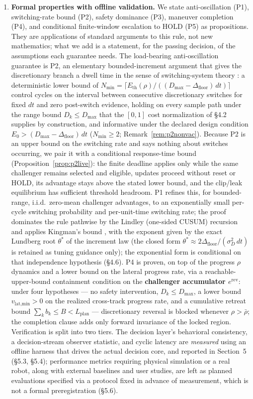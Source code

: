 \documentclass[11pt]{article}
\newcommand{\Dfloor}{\Delta_{\text{floor}}}
\newcommand{\Erev}{e^{\text{rev}}}
\newcommand{\Eth}{E_{\text{th}}}
\begin{document}
\begin{enumerate}
\item \textbf{Formal properties with offline validation.} We state anti-oscillation (P1), switching-rate bound (P2), safety dominance (P3), maneuver completion (P4), and conditional finite-window escalation to HOLD (P5) as propositions. They are applications of standard arguments to this rule, not new mathematics; what we add is a statement, for the passing decision, of the assumptions each guarantee needs. The load-bearing anti-oscillation guarantee is P2, an elementary bounded-increment argument that gives the discretionary branch a dwell time in the sense of switching-system theory \cite{hespanha1999dwell}: a deterministic lower bound of $N_{\min} = \lceil \Eth(\rho)/((D_{\max}-\Dfloor)\,dt)\rceil$ control cycles on the interval between consecutive discretionary switches for fixed $dt$ and zero post-switch evidence, holding on every sample path under the range bound $D_k \le D_{\max}$ that the $[0,1]$ cost normalization of \S4.2 supplies by construction, and informative under the declared design condition $E_0 > (D_{\max}-\Dfloor)\,dt$ ($N_{\min} \ge 2$; Remark~\ref{rem:p2nonvac}). Because P2 is an upper bound on the switching rate and says nothing about switches occurring, we pair it with a conditional response-time bound (Proposition~\ref{prop:p2live}): the finite deadline applies only while the same challenger remains selected and eligible, updates proceed without reset or HOLD, its advantage stays above the stated lower bound, and the clip/leak equilibrium has sufficient threshold headroom. P1 refines this, for bounded-range, i.i.d.\ zero-mean challenger advantages, to an exponentially small per-cycle switching probability and per-unit-time switching rate; the proof dominates the rule pathwise by the Lindley (one-sided CUSUM) recursion \cite{lindley1952queue, page1954cusum} and applies Kingman's bound \cite{kingman1970queues}, with the exponent given by the exact Lundberg root $\theta^*$ of the increment law (the closed form $\theta^* \approx 2\Dfloor/(\sigma_D^2\,dt)$ is retained as tuning guidance only); the exponential form is conditional on that independence hypothesis (\S4.6). P4 is proven, on top of the progress $\rho$ dynamics and a lower bound on the lateral progress rate, via a reachable-upper-bound containment condition on the \textbf{challenger accumulator $\Erev$}: under four hypotheses --- no safety intervention, $D_k\le D_{\max}$, a lower bound $v_{\text{lat,min}}>0$ on the realized cross-track progress rate, and a cumulative retreat bound $\sum_k b_k\le B<L_{\text{plan}}$ --- discretionary reversal is blocked whenever $\rho>\bar\rho$; the completion clause adds only forward invariance of the locked region. Verification is split into two tiers. The decision layer's behavioral consistency, a decision-stream observer statistic, and cyclic latency are \emph{measured} using an offline harness that drives the actual decision core, and reported in Section~5 (\S5.3, \S5.4); performance metrics requiring physical simulation or a real robot, along with external baselines and user studies, are left as planned evaluations specified via a protocol fixed in advance of measurement, which is not a formal preregistration (\S5.6).
\end{enumerate}
\end{document}
